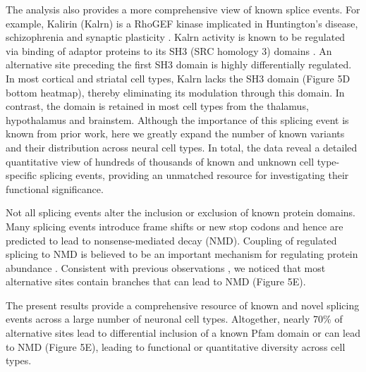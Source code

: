 The analysis also provides a more comprehensive view of known splice events. For example, Kalirin (Kalrn) is a RhoGEF kinase implicated in Huntington's disease, schizophrenia and synaptic plasticity \citep{Penzes_2008}. Kalrn activity is known to be regulated via binding of adaptor proteins to its SH3 (SRC homology 3) domains \citep{Schiller_2006}. An alternative site preceding the first SH3 domain is highly differentially regulated. In most cortical and striatal cell types, Kalrn lacks the SH3 domain (Figure 5D bottom heatmap), thereby eliminating its modulation through this domain. In contrast, the domain is retained in most cell types from the thalamus, hypothalamus and brainstem. Although the importance of this splicing event is known from prior work, here we greatly expand the number of known variants and their distribution across neural cell types. In total, the data reveal a detailed quantitative view of hundreds of thousands of known and unknown cell type-specific splicing events, providing an unmatched resource for investigating their functional significance.

Not all splicing events alter the inclusion or exclusion of known protein domains. Many splicing events introduce frame shifts or new stop codons and hence are predicted to lead to nonsense-mediated decay (NMD). Coupling of regulated splicing to NMD is believed to be an important mechanism for regulating protein abundance \cite{Lewis_2002}. Consistent with previous observations \citep{Yan_2015}, we noticed that most alternative sites contain branches that can lead to NMD (Figure 5E). 

The present results provide a comprehensive resource of known and novel splicing events across a large number of neuronal cell types. Altogether, nearly 70\% of alternative sites lead to differential inclusion of a known Pfam domain or can lead to NMD (Figure 5E), leading to functional or quantitative diversity across cell types.
